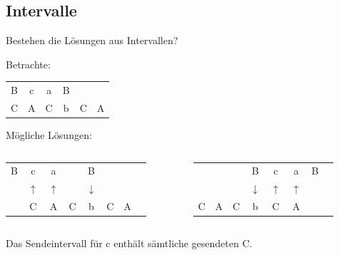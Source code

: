 \documentclass[ignorenonframetext]{beamer}
\newcommand{\mybreak}{\par\vspace*{\baselineskip}}
\begin{document}
\subsection{Intervalle}
\begin{frame}
	
	
	Bestehen die Lösungen aus Intervallen?\mybreak
	
	Betrachte:\mybreak
	
	\begin{tabular}{cccccc}
		B & c & a & B &   & \\
		C & A & C & b & C & A
	\end{tabular} \mybreak
	
	\pause
	
	Mögliche Lösungen:\mybreak
	
	
	
	\begin{columns}
		\begin{column}{5cm}
			\begin{tabular}{cccccccc}
				B & c & a & & B \\
				& $\uparrow$ & $\uparrow$ && $\downarrow$ \\
				& C & A & C & b & C & A
			\end{tabular} 
		\end{column}


		\begin{column}{5cm}
			\begin{tabular}{cccccccc}
				&   &   & B & c & a & B \\
				&   &   & $\downarrow$ & $\uparrow$ & $\uparrow$ & \\
				C & A & C & b & C & A
			\end{tabular} 
		\end{column}
	\end{columns}
	
	\mybreak Das Sendeintervall für c enthält sämtliche gesendeten C.
	
%	
\end{frame}
\end{document}
